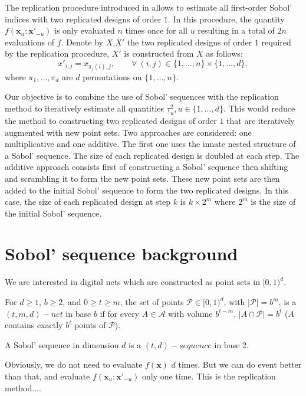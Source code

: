 \documentclass[]{elsarticle}
\theoremstyle{definition}
\newcommand{\cube}{[0,1)^d}
\newcommand{\bvec}[1]{\boldsymbol{#1}}
\newcommand{\vx}{\bvec{x}}
\begin{document}
The replication procedure introduced in \cite{} allows to estimate all first-order Sobol' indices with two replicated designs of order $1$. In this procedure, the quantity $f(\vx_u:{\vx'}_{-u})$ is only evaluated $n$ times once for all $u$ resulting in a total of $2n$ evaluations of $f$. Denote by $X$,$X'$ the two replicated designs of order $1$ required by the replication procedure, $X'$ is constructed from $X$ as follows:
\[{x'}_{i,j}=x_{\pi_j(i),j}, \qquad \forall \ (i,j) \in \{1,\dots,n\} \times \{1,\dots,d\},\]
where $\pi_1,\dots,\pi_d$ are $d$ permutations on $\{1,\dots,n\}$.
\bigskip

Our objective is to combine the use of Sobol' sequences with the replication method to iteratively estimate all quantities $\underline{\tau}_u^2, u \in \{1,\dots,d\}$. This would reduce the method to constructing two replicated designs of order $1$ that are iteratively augmented with new point sets. Two approaches are considered: one multiplicative and one additive. The first one uses the innate nested structure of a Sobol' sequence. The size of each replicated design is doubled at each step. The additive approach consists first of constructing a Sobol' sequence then shifting and scrambling it to form the new point sets. These new point sets are then added to the initial Sobol' sequence to form the two replicated designs. In this case, the size of each replicated design at step $k$ is $ k \times 2^m$ where $2^m$ is the size of the initial Sobol' sequence.



\section{Sobol' sequence background}

We are interested in digital nets which are constructed as point sets in $\cube$.

For $d\geq 1$, $b\geq 2$, and $0\geq t\geq m$, the set of points $\mathcal{P}\in\cube$, with $|\mathcal{P}|=b^m$, is a $(t,m,d)-net$ in base $b$ if for every $A\in\mathcal{A}$ with volume $b^{t-m}$, $|A\cap\mathcal{P}|=b^t$ ($A$ contains exactly $b^t$ points of $\mathcal{P}$).

A Sobol' sequence in dimension $d$ is a $(t,d)-sequence$ in base 2.

Obviously, we do not need to evaluate $f(\vx)$ $d$ times. But we can do event better than that, and evaluate $f(\vx_u:{\vx'}_{-u})$ only one time. This is the replication method....
\end{document}
